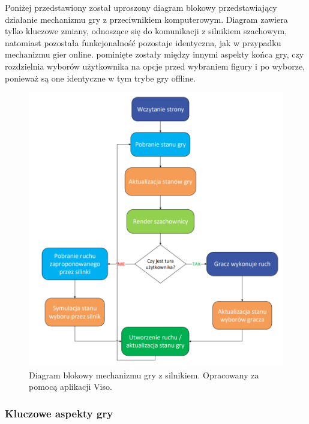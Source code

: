 \documentclass[twoside]{projektInzynierskiMS1}
\begin{document}
\newpage

\noindent
Poniżej przedstawiony został uproszony diagram blokowy przedstawiający działanie mechanizmu gry z przeciwnikiem komputerowym. Diagram zawiera tylko kluczowe zmiany, odnoszące się do komunikacji z silnikiem szachowym, natomiast pozostała funkcjonalność pozostaje identyczna, jak w przypadku mechanizmu gier online. pominięte zostały między innymi aspekty końca gry, czy rozdzielnia wyborów użytkownika na opcje przed wybraniem figury i po wyborze, ponieważ są one identyczne w tym trybe gry offline.

\vspace{1cm}
\begin{figure}[h!]
    \centering
    \includegraphics[width=1\textwidth]{images/diagram_enggry.png}
    \caption{Diagram blokowy mechanizmu gry z silnikiem. Opracowany za pomocą aplikacji Viso.}
\end{figure}

\newpage

\subsubsection{Kluczowe aspekty gry}
\end{document}
